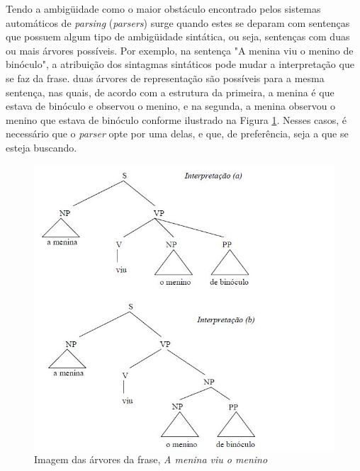 Tendo a ambigüidade como o maior obstáculo encontrado pelos sistemas automáticos de \emph{parsing} (\emph{parsers}) surge quando estes se deparam com sentenças que possuem algum tipo de ambigüidade sintática, ou seja, sentenças com duas ou mais árvores possíveis. Por exemplo, na sentença "A menina viu o menino de binóculo", a atribuição dos sintagmas sintáticos pode mudar a interpretação que se faz da frase. duas árvores de representação são possíveis para a mesma sentença, nas quais, de acordo com a estrutura da primeira, a menina é que estava de binóculo e observou o menino, e na segunda, a menina observou o menino que estava de binóculo conforme ilustrado na Figura \ref{ambiguidade}. Nesses casos, é necessário que o \emph{parser} opte por uma delas, e que, de preferência, seja a que se esteja buscando.




\begin{figure}
	\begin{center}
		\includegraphics[scale=0.5]{ambig.jpg}
		\caption{\label{ambiguidade} Imagem das árvores da frase, \emph{A menina viu o menino}}		
	\end{center}
\end{figure}


